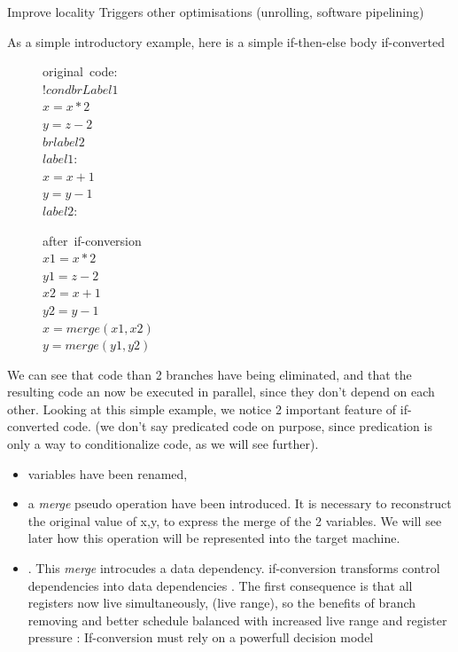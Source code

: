Improve locality
Triggers other optimisations (unrolling, software pipelining)

As a simple introductory example, here is a simple if-then-else body if-converted

\begin{figure}
\begin{minipage}[t]{5cm}
\mbox{original code:} \\
$ !cond br Label1 $ \\
$ x = x * 2 $ \\
$ y = z - 2 $ \\
$ br label2 $ \\
$ label1: $ \\
$ x = x + 1 $ \\
$ y = y - 1 $ \\
$ label2: $ \\
\end{minipage} 
\begin{minipage}[t]{5cm} 
\mbox{after if-conversion} \\
$ x1 = x * 2 $ \\
$ y1 = z - 2 $ \\
$ x2 = x + 1 $ \\
$ y2 = y - 1 $ \\
$ x = \textit{merge}(x1,x2) $ \\
$ y = \textit{merge}(y1,y2) $ \\
\end{minipage}
\end{figure}

We can see that code than 2 branches have being eliminated, and that the resulting code an now be executed in parallel, since they don't depend on each other. Looking at this simple example, we notice 2 important feature of if-converted code. (we don't say predicated code on purpose, since predication is only a way to conditionalize code, as we will see further).

\begin{itemize}
\item variables have been renamed, 
\item a \textit{merge} pseudo operation have been introduced. It is necessary to reconstruct the original value of x,y, to express the merge of the 2 variables. We will see later how this operation will be represented into the target machine.
\item. This \textit{merge} introcudes a data dependency. if-conversion transforms control dependencies into data dependencies \cite{Allen:1983:CCD:567067.567085}. The first consequence is that all registers now live simultaneously, (live range), so the benefits of branch removing and better schedule balanced with increased live range and register pressure : If-conversion must rely on a powerfull decision model
\end{itemize}

